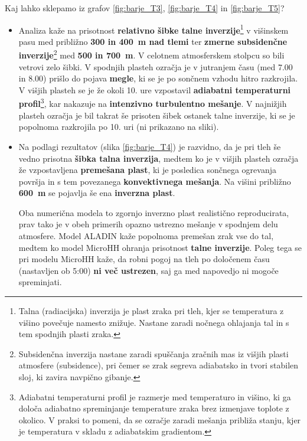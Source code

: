 \documentclass[mat2, tisk]{fmfdelo}
\begin{document}
Kaj lahko sklepamo iz grafov \ref{fig:barje_T3}, \ref{fig:barje_T4} in \ref{fig:barje_T5}?
\begin{itemize}
  \item 
  Analiza kaže na prisotnost \textbf{relativno šibke talne inverzije}\footnote{Talna (radiacijska) inverzija je plast zraka pri tleh, kjer se temperatura z višino povečuje namesto znižuje. Nastane zaradi nočnega ohlajanja tal in s tem spodnjih plasti zraka.} 
  v višinskem pasu med približno \textbf{300 in 400~m nad tlemi} ter 
  \textbf{zmerne subsidenčne inverzije}\footnote{Subsidenčna inverzija nastane zaradi spuščanja zračnih mas iz višjih plasti atmosfere (subsidence), pri čemer se zrak segreva adiabatsko in tvori stabilen sloj, ki zavira navpično gibanje.} 
  med \textbf{500 in 700~m}. 
  V celotnem atmosferskem stolpcu so bili vetrovi zelo šibki. 
  V spodnjih plasteh ozračja je v {jutranjem času (med 7.00 in 8.00)} prišlo do pojava \textbf{megle}, 
  ki se je po sončnem vzhodu hitro razkrojila. 
  V višjih plasteh se je že okoli {10. ure} vzpostavil \textbf{adiabatni temperaturni profil}\footnote{Adiabatni temperaturni profil je razmerje med temperaturo in višino, ki ga določa adiabatno spreminjanje temperature zraka brez izmenjave toplote z okolico. V praksi to pomeni, da se ozračje zaradi mešanja približa stanju, kjer je temperatura v skladu z adiabatskim gradientom.}, 
  kar nakazuje na \textbf{intenzivno turbulentno mešanje}. 
  V najnižjih plasteh ozračja je bil takrat še prisoten šibek ostanek talne inverzije, 
  ki se je popolnoma razkrojila po {10. uri} (ni prikazano na sliki).
  
 \item Na podlagi rezultatov (slika \ref{fig:barje_T4}) je razvidno, da je pri tleh še vedno prisotna 
\textbf{šibka talna inverzija}, medtem ko je v višjih plasteh ozračja že vzpostavljena 
\textbf{premešana plast}, ki je posledica {sončnega ogrevanja površja} in s tem povezanega 
\textbf{konvektivnega mešanja}. 
Na višini približno \textbf{600~m} se pojavlja še ena \textbf{inverzna plast}. 

\newpage
Oba numerična modela to zgornjo inverzno plast {realistično reproducirata}, 
prav tako je v obeh primerih opazno ustrezno mešanje v spodnjem delu atmosfere. 
Model {ALADIN} 
kaže popolnoma {premešan zrak vse do tal}, medtem ko model 
{MicroHH} ohranja prisotnost \textbf{talne inverzije}. 
Poleg tega se pri modelu MicroHH kaže, da {robni pogoj na tleh} 
po določenem času (nastavljen ob {5:00}) \textbf{ni več ustrezen}, saj ga med napovedjo ni mogoče spreminjati. 


\end{itemize}
\end{document}

